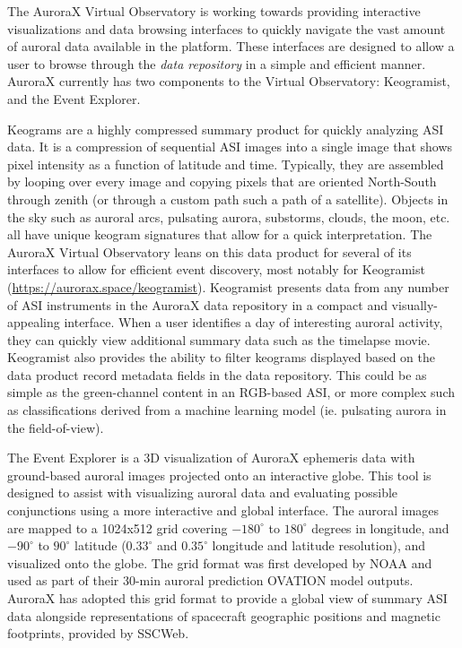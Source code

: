 \documentclass[utf8]{FrontiersinHarvard} %
\begin{document}
The AuroraX Virtual Observatory is working towards providing interactive visualizations and data browsing interfaces to quickly navigate the vast amount of auroral data available in the platform. These interfaces are designed to allow a user to browse through the \textit{data repository} in a simple and efficient manner. AuroraX currently has two components to the Virtual Observatory: Keogramist, and the Event Explorer.

Keograms are a highly compressed summary product for quickly analyzing ASI data. It is a compression of sequential ASI images into a single image that shows pixel intensity as a function of latitude and time. Typically, they are assembled by looping over every image and copying pixels that are oriented North-South through zenith (or through a custom path such a path of a satellite). Objects in the sky such as auroral arcs, pulsating aurora, substorms, clouds, the moon, etc. all have unique keogram signatures that allow for a quick interpretation. The AuroraX Virtual Observatory leans on this data product for several of its interfaces to allow for efficient event discovery, most notably for Keogramist (\url{https://aurorax.space/keogramist}). Keogramist presents data from any number of ASI instruments in the AuroraX data repository in a compact and visually-appealing interface. When a user identifies a day of interesting auroral activity, they can quickly view additional summary data such as the timelapse movie. Keogramist also provides the ability to filter keograms displayed based on the data product record metadata fields in the data repository. This could be as simple as the green-channel content in an RGB-based ASI, or more complex such as classifications derived from a machine learning model (ie. pulsating aurora in the field-of-view).

The Event Explorer is a 3D visualization of AuroraX ephemeris data with ground-based auroral images projected onto an interactive globe. This tool is designed to assist with visualizing auroral data and evaluating possible conjunctions using a more interactive and global interface. The auroral images are mapped to a 1024x512 grid covering $-180^\circ$ to $180^\circ$ degrees in longitude, and $-90^\circ$ to $90^\circ$ latitude ($0.33^\circ$ and $0.35^\circ$ longitude and latitude resolution), and visualized onto the globe. The grid format was first developed by NOAA and used as part of their 30-min auroral prediction OVATION model outputs. AuroraX has adopted this grid format to provide a global view of summary ASI data alongside representations of spacecraft geographic positions and magnetic footprints, provided by SSCWeb.
\end{document}
